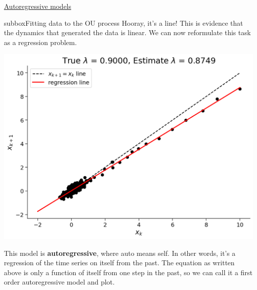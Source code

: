 \begin{textbox}{\href{https://compneuro.neuromatch.io/tutorials/W2D2_LinearSystems/student/W2D2_Tutorial4.html}{Autoregressive models } }
\begin{subbox}{subbox}{Fitting data to the OU process}
Hooray, it's a line! This is evidence that the dynamics that generated the data is linear. We can now reformulate this task as a regression problem.
\begin{center}
\includegraphics[scale=0.25]{Figures/LS/CDS_Figure10.png}
\end{center}
This model is \textbf{autoregressive}, where auto means self. In other words, it's a regression of the time series on itself from the past. The equation as written above is only a function of itself from one step in the past, so we can call it a first order autoregressive model and plot.

\end{subbox}
\end{textbox}
